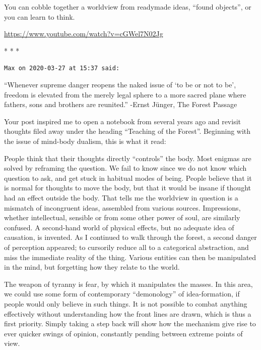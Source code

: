 You can cobble together a worldview from readymade ideas, ``found objects'', or you can learn to think.

\url{https://www.youtube.com/watch?v=cGWel7N02Jg} 


\begin{center}* * *\end{center}

\begin{footnotesize}
\begin{sffamily}
\texttt{Max on 2020-03-27 at 15:37 said:}

``Whenever supreme danger reopens the naked issue of `to be or not to be', freedom is elevated from the merely legal sphere to a more sacred plane where fathers, sons and brothers are reunited.'' -Ernst Jünger, The Forest Passage

Your post inspired me to open a notebook from several years ago and revisit thoughts filed away under the heading ``Teaching of the Forest''. Beginning with the issue of mind-body dualism, this is what it read:

People think that their thoughts directly ``controls'' the body. Most enigmas are solved by reframing the question. We fail to know since we do not know which question to ask, and get stuck in habitual modes of being. People believe that it is normal for thoughts to move the body, but that it would be insane if thought had an effect outside the body. That tells me the worldview in question is a mismatch of incongruent ideas, assembled from various sources. Impressions, whether intellectual, sensible or from some other power of soul, are similarly confused. A second-hand world of physical effects, but no adequate idea of causation, is invented. As I continued to walk through the forest, a second danger of perception appeared; to cursorily reduce all to a categorical abstraction, and miss the immediate reality of the thing. Various entities can then be manipulated in the mind, but forgetting how they relate to the world.

The weapon of tyranny is fear, by which it manipulates the masses. In this area, we could use some form of contemporary ``demonology'' of idea-formation, if people would only believe in such things. It is not possible to combat anything effectively without understanding how the front lines are drawn, which is thus a first priority. Simply taking a step back will show how the mechanism give rise to ever quicker swings of opinion, constantly pending between extreme points of view.


\end{sffamily}
\end{footnotesize}
